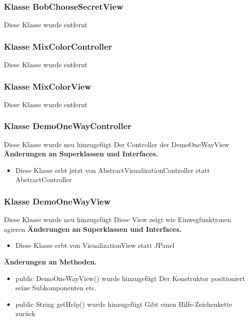 \documentclass{article}
\begin{document}
	\subsubsection{Klasse BobChooseSecretView}
    Diese Klasse wurde entfernt

	\subsubsection{Klasse MixColorController}
    Diese Klasse wurde entfernt

	\subsubsection{Klasse MixColorView}
    Diese Klasse wurde entfernt

	\subsubsection{Klasse DemoOneWayController}
    Diese Klasse wurde neu hinzugefügt
    Der Controller der DemoOneWayView
	    \textbf{Änderungen an Superklassen und Interfaces.}\newline
	   \begin{itemize}
            \item Diese Klasse erbt jetzt von AbstractVisualizationController statt AbstractController\newline
           \end{itemize}

	\subsubsection{Klasse DemoOneWayView}
    Diese Klasse wurde neu hinzugefügt
    Diese View zeigt wie Einwegfunktionen agieren
	    \textbf{Änderungen an Superklassen und Interfaces.}\newline
	   \begin{itemize}
            \item Diese Klasse erbt von VisualizationView statt JPanel
           \end{itemize}
    \textbf{Änderungen an Methoden.}\newline
	   \begin{itemize}
           \item public DemoOneWayView() wurde hinzugefügt\newline
               Der Konstruktor positioniert seine Subkomponenten etc.
           \item public String getHelp() wurde hinzugefügt\newline
               Gibt einen Hilfe-Zeichenkette zurück
           \end{itemize}
\end{document}
